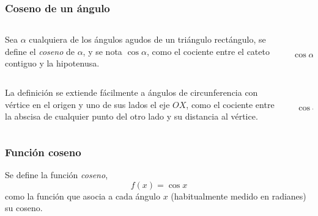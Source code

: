 	
	\begin{frame}
		\frametitle{Coseno de un ángulo}
		\begin{definicion}
			\begin{columns}
				\begin{column}{0.6\textwidth}
					Sea $\alpha$ cualquiera de los ángulos agudos de un triángulo rectángulo, se define el \emph{coseno} de $\alpha$, y se
					nota $\cos \alpha$, como el cociente entre el cateto contiguo y la hipotenusa.
				\end{column}
				\begin{column}{0.2\textwidth}
					\begin{center}
						\scalebox{1}{}\\
						\scriptsize 
						$\cos \alpha= \dfrac{AB}{AC}$
					\end{center}
				\end{column}
			\end{columns}
		\end{definicion}
		\bigskip
		\begin{columns}
			\begin{column}{0.6\textwidth}
				La definición se extiende fácilmente a ángulos de circunferencia con vértice en el origen y uno de sus lados el eje $OX$, como el cociente entre la abscisa de cualquier punto del otro lado y su distancia al vértice.
			\end{column}
			\begin{column}{0.2\textwidth}
				\begin{center}
					\scalebox{1}{}\\
					\scriptsize
					$\cos \alpha= \dfrac{AB}{AC}$
				\end{center}
			\end{column}
		\end{columns}
	\end{frame} 
	
	
	\begin{frame}
		\frametitle{Función coseno}
		\begin{definicion}
			Se define la función \emph{coseno},
			\[f(x)=\cos x\]
			como la función que asocia a cada ángulo $x$ (habitualmente medido en radianes) su coseno.
		\end{definicion}
		\begin{center}
			\scalebox{1}{}
		\end{center}
	\end{frame} 
	
